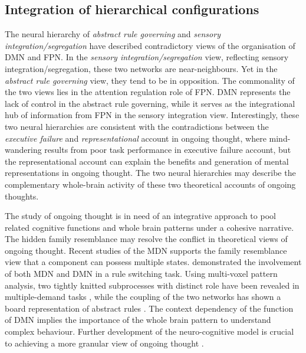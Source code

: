 \subsection{Integration of hierarchical configurations}

The neural hierarchy of \textit{abstract rule governing} and \textit{sensory integration/segregation} have described contradictory views of the organisation of DMN and FPN. In the \textit{sensory integration/segregation} view, reflecting sensory integration/segregation, these two networks are near-neighbours. Yet in the \textit{abstract rule governing} view, they tend to be in opposition.
The commonality of the two views lies in the attention regulation role of FPN. DMN represents the lack of control in the abstract rule governing, while it serves as the integrational hub of information from FPN in the sensory integration view. Interestingly, these two neural hierarchies are consistent with the contradictions between the \textit{executive failure} and \textit{representational} account in ongoing thought, where mind-wandering results from poor task performance in executive failure account, but the representational account can explain the benefits and generation of mental representations in ongoing thought. 
The two neural hierarchies may describe the complementary whole-brain activity of these two theoretical accounts of ongoing thoughts. 

The study of ongoing thought is in need of an integrative approach to pool related cognitive functions and whole brain patterns under a cohesive narrative. The hidden family resemblance may resolve the conflict in theoretical views of ongoing thought. Recent studies of the MDN supports the family resemblance view that a component can possess multiple states. %
 demonstrated the involvement of both MDN and DMN in a rule switching task. Using multi-voxel pattern analysis, two tightly knitted subprocesses with distinct role have been revealed in multiple-demand tasks \cite{Crittenden2015}, while the coupling of the two networks has shown a board representation of abstract rules \cite{Crittenden2016}. 
The context dependency of the function of DMN implies the importance of the whole brain pattern to understand complex behaviour. Further development of the neuro-cognitive model is crucial to achieving a more granular view of ongoing thought \cite{Mittner2016,SmallwoodFrontiers2013}. 

